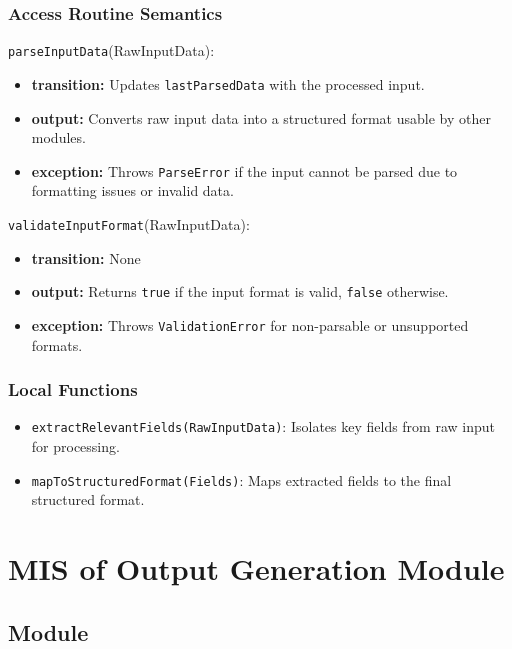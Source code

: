 \documentclass[12pt, titlepage]{article}
\begin{document}
\subsubsection{Access Routine Semantics}

\noindent \texttt{parseInputData}(RawInputData):
\begin{itemize}
    \item \textbf{transition:} Updates \texttt{lastParsedData} with the processed input.
    \item \textbf{output:} Converts raw input data into a structured format usable by other modules.
    \item \textbf{exception:} Throws \texttt{ParseError} if the input cannot be parsed due to formatting issues or invalid data.
\end{itemize}

\noindent \texttt{validateInputFormat}(RawInputData):
\begin{itemize}
    \item \textbf{transition:} None
    \item \textbf{output:} Returns \texttt{true} if the input format is valid, \texttt{false} otherwise.
    \item \textbf{exception:} Throws \texttt{ValidationError} for non-parsable or unsupported formats.
\end{itemize}

\subsubsection{Local Functions}

\begin{itemize}
    \item \texttt{extractRelevantFields(RawInputData)}: Isolates key fields from raw input for processing.
    \item \texttt{mapToStructuredFormat(Fields)}: Maps extracted fields to the final structured format.
\end{itemize}

\newpage


\section{MIS of Output Generation Module}\label{output_generation_module}

\subsection{Module}
\end{document}
